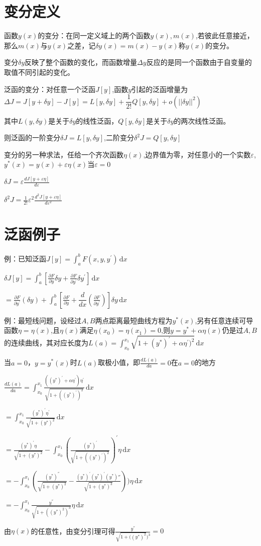 \documentclass[UTF8]{ctexart}
\begin{document}
\section{变分定义}
函数$y(x)$的变分：在同一定义域上的两个函数$y(x),m(x)$,若彼此任意接近，那么$m(x)$与$y(x)$之差，记$\delta y(x)=m(x)-y(x)$称$y(x)$的变分。

变分$\delta y$反映了整个函数的变化，而函数增量$ \Delta y $反应的是同一个函数由于自变量的取值不同引起的变化。

泛函的变分：对任意一个泛函$J[y]$,函数$y$引起的泛函增量为$\Delta J=J[y+\delta y]-J[y]=L[y,\delta y]+\dfrac{1}{2!}Q[y,\delta y]+o(||\delta y||^2)$

其中$L(y,\delta y)$是关于$\delta y$的线性泛函，$Q[y,\delta y]$是关于$\delta y$的两次线性泛函。

则泛函的一阶变分$\delta J=L[y,\delta y]$,二阶变分$\delta^2J=Q[y,\delta y]$

变分的另一种求法，任给一个齐次函数$\eta(x)$,边界值为零，对任意小的一个实数$\varepsilon$,$y^{*}(x)=y(x)+\varepsilon\eta(x)$当$\varepsilon=0$

$\delta J=\varepsilon\frac{dJ[y+\varepsilon\eta]}{d\varepsilon}$

$\delta^2 J=\frac{1}{2!}\varepsilon^2\frac{d^2J[y+\varepsilon\eta]}{d\varepsilon^2}$
\section{泛函例子}
例：已知泛函$J[y]=\int_{a}^{b}F(x,y,y^{'})\,\mathrm{d}x$

$ \delta J[y]=\int_{a}^{b}[\frac{\partial F}{\partial y}\delta y+\frac{\partial F}{\partial y^{'}}\delta y^{'}]\,\mathrm{d}x $

$=\frac{\partial F}{\partial y^{'}}(\delta y)+\int_{a}^{b}[\frac{\partial F}{\partial y}+\dfrac{d}{dx}(\frac{\partial F}{\partial y^{'}})]\delta y\,\mathrm{d}x $

例：最短线问题，设经过$A,B$两点距离最短曲线方程为$y^{*}(x)$,另有任意连续可导函数$\eta=\eta(x)$,且$\eta(x)$满足$\eta(x_{0})=\eta(x_{1})=0$,则$y=y^{*}+\alpha\eta(x)$仍是过$A,B$的连续曲线，其对应长度为$L(a)=\int_{x_{0}}^{x_{1}}\sqrt{1+(y^{*})^{'}+\alpha\eta^{'})^2}\,\mathrm{d}x$

当$a=0$，$y=y^{*}(x)$时$L(a)$取极小值，即$\frac{dL(a)}{da}=0$在$a=0$的地方

$\frac{dL(a)}{da}=\int_{x_{0}}^{x_{1}}\frac{((y^{*})^{'}+\alpha\eta^{'})\eta^{'}}{\sqrt{1+((y^{*})^{'})^2}}\,\mathrm{d}x$

$=\int_{x_{0}}^{x_{1}}\frac{(y^{*})^{'}\eta^{'}}{\sqrt{1+(y^{*})^2}}\,\mathrm{d}x$ 

$=\frac{(y^{*})^{'}\eta}{\sqrt{1+(y^{*})^2}}-\int_{x_{0}}^{x_{1}}(\frac{(y^{*})^{'}}{\sqrt{1+((y^{*})^{'})^2}})^{'}\eta\,\mathrm{d}x$

$=-\int_{x_{0}}^{x_{1}}(\frac{(y^{*})^{''}}{\sqrt{1+(y^{*})^2}}-\frac{(y^{*})^{'} (y^{*})^{'}(y^{*}){''}}{\sqrt{1+(y^{*})^3}}))\eta\,\mathrm{d}x$

$=-\int_{x_{0}}^{x_{1}}\frac{y^{''}}{\sqrt{1+((y^{*})^{2})^3}}\eta\,\mathrm{d}x$

由$\eta(x)$的任意性，由变分引理可得$\frac{y^{''}}{\sqrt{1+((y^{*})^{2}})^{3}}=0$
\end{document}
